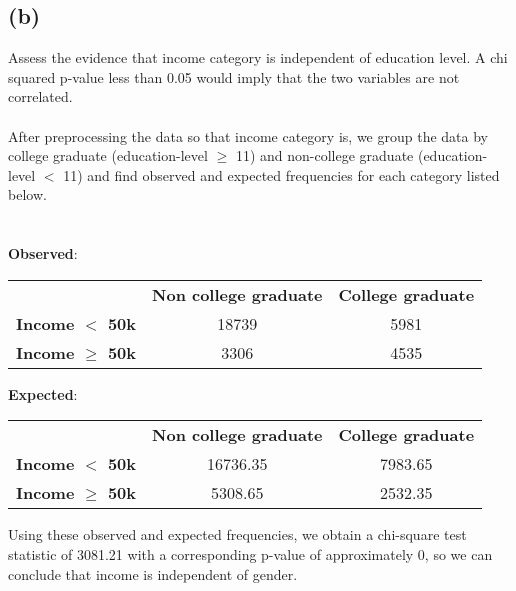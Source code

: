 \documentclass[11pt]{article}
\begin{document}
\subsection*{(b)}
Assess the evidence that income category is independent of education level. A chi squared p-value less than 0.05 would imply that the two variables are not correlated. \\ \\
After preprocessing the data so that income category is, we group the data by college graduate (education-level $\geq$ 11) and non-college graduate (education-level $<$ 11) and find observed and expected frequencies for each category listed below. \\ \\
\clearpage
\ \\
\textbf{Observed}:
\begin{center}
\begin{tabular}{ c c c }
& \textbf{Non college graduate} & \textbf{College graduate} \\
\textbf{Income $<$ 50k} & 18739 & 5981 \\
\textbf{Income $\geq$ 50k} & 3306 & 4535
\end{tabular}
\end{center}
\textbf{Expected}:
\begin{center}
\begin{tabular}{ c c c }
& \textbf{Non college graduate} & \textbf{College graduate} \\
\textbf{Income $<$ 50k} & 16736.35 & 7983.65 \\
\textbf{Income $\geq$ 50k} & 5308.65 & 2532.35
\end{tabular}
\end{center}
Using these observed and expected frequencies, we obtain a chi-square test statistic of 3081.21 with a corresponding p-value of approximately 0, so we can conclude that income is independent of gender.
\end{document}
